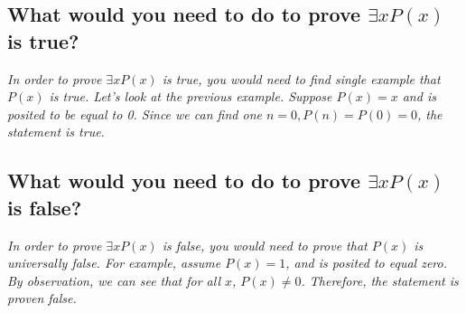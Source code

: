 \documentclass{article}
\begin{document}
\subsection{What would you need to do to prove $\exists xP(x)$ is true?}
\hspace{1cm}\textit{In order to prove $\exists xP(x)$ is true, you would need to find single example that $P(x)$ is true. Let's look at the previous example. Suppose $P(x) = x$ and is posited to be equal to 0. Since we can find one $n = 0, P(n) = P(0) = 0$, the statement is true.}
\subsection{What would you need to do to prove $\exists xP(x)$ is false?}
\hspace{1cm}\textit{In order to prove $\exists xP(x)$ is false, you would need to prove that $P(x)$ is universally false. For example, assume $P(x) = 1$, and is posited to equal zero. By observation, we can see that for all $x$, $P(x) \neq 0$. Therefore, the statement is proven false.}


\end{document}
